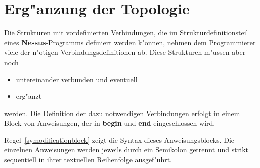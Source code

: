 \chapter{Erg"anzung der Topologie}
\label{Topologie}


Die Strukturen mit vordefinierten Verbindungen, die
im Strukturdefinitionsteil eines {\bf Nessus}-Programms definiert
werden k"onnen, nehmen dem Programmierer viele der n"otigen
Verbindungsdefinitionen ab. Diese Strukturen
 m"ussen aber noch
 
\begin{itemize}
  \item untereinander verbunden und eventuell
  \item erg"anzt
\end{itemize}

werden. Die Definition der dazu notwendigen
Verbindungen erfolgt in
einem Block von Anweisungen, der in {\bf begin} und {\bf
end} eingeschlossen wird.

\begin{center}
\end{center}

Regel~\ref{symodificationblock} zeigt die Syntax dieses
Anweisungsblocks. Die einzelnen Anweisungen werden jeweils durch ein
Semikolon getrennt und strikt sequentiell in ihrer textuellen
Reihenfolge ausgef"uhrt.

